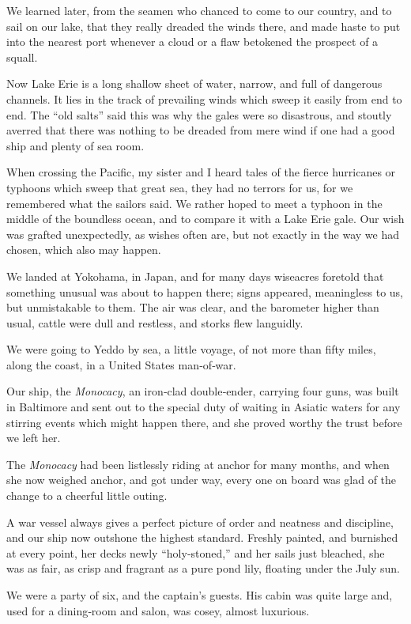 \documentclass[12pt]{book}
\begin{document}
We learned later, from the seamen who chanced to come to our country, and
to sail on our lake, that they really dreaded the winds there, and made haste to
put into the nearest port whenever a cloud or a flaw betokened the prospect of a
squall.

Now Lake Erie is a long shallow sheet of water, narrow, and full of dangerous
channels. It lies in the track of prevailing winds which sweep it easily from end
to end. The “old salts” said this was why the gales were so disastrous, and stoutly
averred that there was nothing to be dreaded from mere wind if one had a good
ship and plenty of sea room.

When crossing the Pacific, my sister and I heard tales of the fierce hurricanes
or typhoons which sweep that great sea, they had no terrors for us, for we
remembered what the sailors said. We rather hoped to meet a typhoon in the
middle of the boundless ocean, and to compare it with a Lake Erie gale. Our wish
was grafted unexpectedly, as wishes often are, but not exactly in the way we had
chosen, which also may happen.

We landed at Yokohama, in Japan, and for many days wiseacres foretold that
something unusual was about to happen there; signs appeared, meaningless to
us, but unmistakable to them. The air was clear, and the barometer higher than
usual, cattle were dull and restless, and storks flew languidly.

We were going to Yeddo by sea, a little voyage, of not more than fifty miles,
along the coast, in a United States man‐of‐war.

Our ship, the {\it Monocacy}, an iron‐clad double‐ender, carrying four guns, was
built in Baltimore and sent out to the special duty of waiting in Asiatic waters for
any stirring events which might happen there, and she proved worthy the trust
before we left her.

The {\it Monocacy} had been listlessly riding at anchor for many months, and when
she now weighed anchor, and got under way, every one on board was glad of the
change to a cheerful little outing.

A war vessel always gives a perfect picture of order and neatness and discipline,
and our ship now outshone the highest standard. Freshly painted, and burnished
at every point, her decks newly “holy‐stoned,” and her sails just bleached, she
was as fair, as crisp and fragrant as a pure pond lily, floating under the July sun.

We were a party of six, and the captain’s guests. His cabin was quite large
and, used for a dining‐room and salon, was cosey, almost luxurious.
\end{document}
